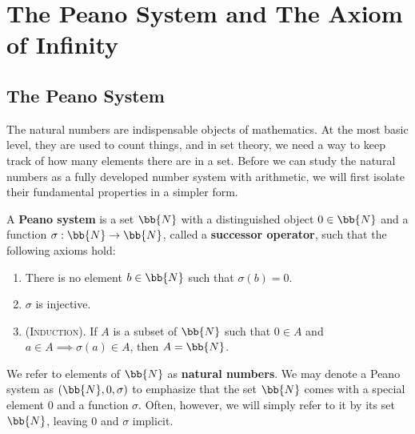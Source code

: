 










% 




\iffalse 
\section{The Peano System and The Axiom of Infinity}

\subsection{The Peano System}

The natural numbers are indispensable objects of mathematics. 
At the most basic level, they are used to count things, and in set theory, we need a way to keep track of how many elements there are in a set.
Before we can study the natural numbers as a fully developed number system with arithmetic, we will first isolate their fundamental properties in a simpler form. 

\begin{definition}
	A \textbf{Peano system} is a set $\bb{N}$ with a distinguished object $0\in\bb{N}$ and a function $\sigma:\bb{N}\rightarrow\bb{N}$, called a \textbf{successor operator}, such that the following axioms hold:
	\begin{enumerate}[itemsep=-0.0ex, label=\textup{(\textup{PA}\arabic*)}]
		\item There is no element $b\in \bb{N}$ such that $\sigma(b) = 0$.
		\item $\sigma$ is injective.
		\item\textsc{(Induction).} 
		If $A$ is a subset of $\bb{N}$ such that $0\in A$ and $a\in A\implies \sigma(a)\in A$, then $A = \bb{N}$. 
	\end{enumerate}
	We refer to elements of $\bb{N}$ as \textbf{natural numbers}.
	We may denote a Peano system as $(\bb{N}, 0, \sigma)$ to emphasize that the set $\bb{N}$ comes with a special element $0$ and a function $\sigma$. 
	Often, however, we will simply refer to it by its set $\bb{N}$, leaving $0$ and $\sigma$ implicit. 
\end{definition}


